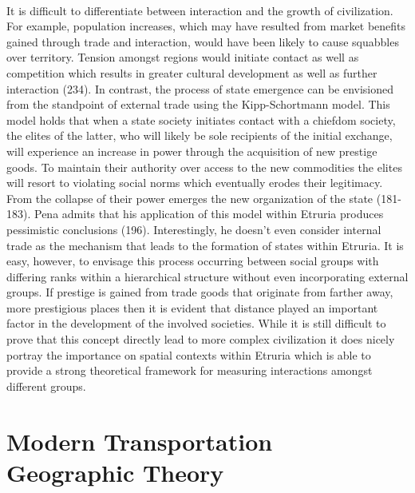 \documentclass[12pt,a4paper]{thesis}
\begin{document}
\paragraph{}
It is difficult to differentiate between interaction and the growth of civilization. For example, population increases, which may have resulted from market benefits gained through trade and interaction, would have been likely to cause squabbles over territory. Tension amongst regions would initiate contact as well as competition which results in greater cultural development as well as further interaction (234). In contrast, the process of state emergence can be envisioned from the standpoint of external trade \citep{Pen11} using the Kipp-Schortmann model. This model holds that when a state society initiates contact with a chiefdom society, the elites of the latter, who will likely be sole recipients of the initial exchange, will experience an increase in power through the acquisition of new prestige goods. To maintain their authority over access to the new commodities the elites will resort to violating social norms which eventually erodes their legitimacy.  From the collapse of their power emerges the new organization of the state (181-183). Pena admits that his application of this model within Etruria produces pessimistic conclusions (196). Interestingly, he doesn't even consider internal trade as the mechanism that leads to the formation of states within Etruria. It is easy, however, to envisage this process occurring between social groups with differing ranks within a hierarchical structure without even incorporating external groups. If prestige is gained from trade goods that originate from farther away, more prestigious places then it is evident that distance played an important factor in the development of the involved societies. While it is still difficult to prove that this concept directly lead to more complex civilization it does nicely portray the importance on spatial contexts within Etruria which is able to provide a strong theoretical framework for measuring interactions amongst different groups. 

\section{Modern Transportation Geographic Theory}
\end{document}
